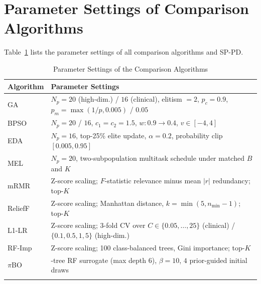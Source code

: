 \clearpage
\appendices
\section{Parameter Settings of Comparison Algorithms}
\label{app:params}

Table~\ref{tab:app_params} lists the parameter settings of all comparison algorithms and SP-PD.

\setcounter{table}{0}
\renewcommand{\thetable}{S-\Roman{table}}

\begin{table}[!htbp]
\centering
\begin{threeparttable}
\caption{Parameter Settings of the Comparison Algorithms}
\label{tab:app_params}
\scriptsize
\setlength{\tabcolsep}{4.5pt}
\renewcommand{\arraystretch}{1.15}
\begin{tabular}{@{}l>{\raggedright\arraybackslash}p{6.15cm}@{}}
\toprule
Algorithm & Parameter Settings \\
\midrule
GA~\cite{holland1992ga} & $N_p = 20$ (high-dim.) / $16$ (clinical), elitism $= 2$, $p_c = 0.9$, $p_m = \max(1/p, 0.005)$ / $0.05$ \\
\addlinespace[2pt]
BPSO~\cite{kennedy1997bpso} & $N_p = 20$ / $16$, $c_1 = c_2 = 1.5$, $w : 0.9 \to 0.4$, $v \in [-4, 4]$ \\
\addlinespace[2pt]
EDA~\cite{baluja1994pbil} & $N_p = 16$, top-25\% elite update, $\alpha = 0.2$, probability clip $[0.005, 0.95]$ \\
\addlinespace[2pt]
MEL~\cite{wang2024mel} & $N_p = 20$, two-subpopulation multitask schedule under matched $B$ and $K$ \\
\addlinespace[2pt]
mRMR~\cite{peng2005mrmr} & Z-score scaling; $F$-statistic relevance minus mean $|r|$ redundancy; top-$K$ \\
\addlinespace[2pt]
ReliefF~\cite{kononenko1994relieff} & Z-score scaling; Manhattan distance, $k = \min(5, n_{\min}-1)$; top-$K$ \\
\addlinespace[2pt]
L1-LR~\cite{tibshirani1996lasso} & Z-score scaling; 3-fold CV over $C \in \{0.05, \dots, 25\}$ (clinical) / $\{0.1, 0.5, 1, 5\}$ (high-dim.)\tnote{a} \\
\addlinespace[2pt]
RF-Imp~\cite{breiman2001rf} & Z-score scaling; 100 class-balanced trees, Gini importance; top-$K$ \\
\addlinespace[2pt]
$\pi$BO~\cite{hvarfner2022pibo} & 32-tree RF surrogate (max depth $6$), $\beta = 10$, $4$ prior-guided initial draws \\
\addlinespace[2pt]

\end{tabular}
\end{threeparttable}
\end{table}
